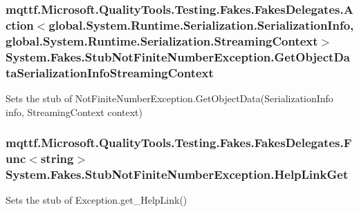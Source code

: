 \hypertarget{class_system_1_1_fakes_1_1_stub_not_finite_number_exception_abc75c7dda25a2e54ae3a1fad5e79894e}{
\subsubsection[{Get\-Object\-Data\-Serialization\-Info\-Streaming\-Context}]{\setlength{\rightskip}{0pt plus 5cm}mqttf.\-Microsoft.\-Quality\-Tools.\-Testing.\-Fakes.\-Fakes\-Delegates.\-Action$<$global.\-System.\-Runtime.\-Serialization.\-Serialization\-Info, global.\-System.\-Runtime.\-Serialization.\-Streaming\-Context$>$ System.\-Fakes.\-Stub\-Not\-Finite\-Number\-Exception.\-Get\-Object\-Data\-Serialization\-Info\-Streaming\-Context}}\label{class_system_1_1_fakes_1_1_stub_not_finite_number_exception_abc75c7dda25a2e54ae3a1fad5e79894e}


Sets the stub of Not\-Finite\-Number\-Exception.\-Get\-Object\-Data(\-Serialization\-Info info, Streaming\-Context context)

\hypertarget{class_system_1_1_fakes_1_1_stub_not_finite_number_exception_a116793a5984dafd308015ebd946c756d}{
\subsubsection[{Help\-Link\-Get}]{\setlength{\rightskip}{0pt plus 5cm}mqttf.\-Microsoft.\-Quality\-Tools.\-Testing.\-Fakes.\-Fakes\-Delegates.\-Func$<$string$>$ System.\-Fakes.\-Stub\-Not\-Finite\-Number\-Exception.\-Help\-Link\-Get}}\label{class_system_1_1_fakes_1_1_stub_not_finite_number_exception_a116793a5984dafd308015ebd946c756d}


Sets the stub of Exception.\-get\-\_\-\-Help\-Link()


